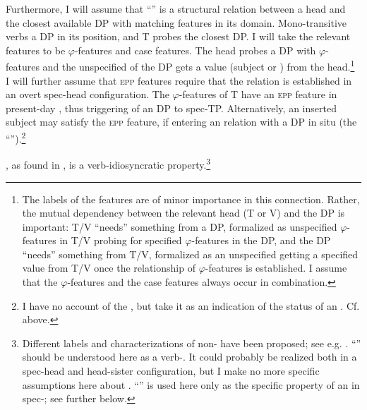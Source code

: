 \documentclass[output=paper]{langscibook}
\begin{document}
Furthermore, I will assume that “” is a  structural relation between a head and the closest available DP with matching features in its  domain. Mono-transitive verbs  a DP in its  position, and T probes the closest DP. I will take the relevant features to be $\varphi $-features and case features. The head probes a DP with $\varphi $-features and the unspecified  of the DP gets a value (subject or ) from the head.\footnote{The labels of the features are of minor importance in this connection. Rather, the mutual dependency between the relevant head (T or V) and the DP is important: T/V “needs” something from a DP, formalized as unspecified $\varphi ${}-features in T/V probing for specified $\varphi ${}-features in the DP, and the DP “needs” something from T/V, formalized as an unspecified  getting a specified value from T/V once the  relationship of $\varphi ${}-features is established. I assume that the $\varphi ${}-features and the case features always occur in combination.} I will further assume that \textsc{epp} features require that the  relation is established in an overt spec-head configuration. The $\varphi $-features of T have an \textsc{epp} feature in present-day , thus triggering  of an DP to spec-TP. Alternatively, an inserted  subject may satisfy the \textsc{epp} feature, if entering an  relation with a DP in situ (the “”).\footnote{I have no account of the , but take it as an indication of the status of an . Cf.  above.}



, as found in , is a verb-idiosyncratic property.\footnote{Different labels and characterizations of non- have been proposed; see e.g. \citet[181–182]{Thrainsson2001}. “” should be understood here as a verb-. It could probably be realized both in a spec-head and head-sister configuration, but I make no more specific assumptions here about .  “” is used here only as the specific property of an  in spec-; see further below.} 
\end{document}
